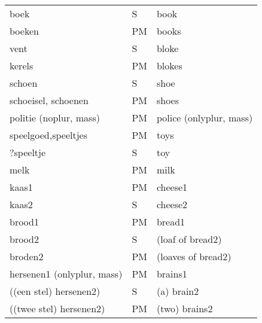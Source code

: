 \begin{tabular}{|l|l|l|} \hline
boek          & S &  book\\        
boeken       & PM &    books\\ \hline

vent               & S &     bloke \\
kerels              & PM &      blokes\\ \hline

schoen              & S&    shoe\\
schoeisel, schoenen              & PM &     shoes\\ \hline
               
politie (noplur, mass) & PM & police (onlyplur, mass)\\ \hline

speelgoed,speeltjes              & PM &    toys\\ 
?speeltje              & S & toy  \\ \hline

melk              &PM &    milk\\ \hline

kaas1              & PM &     cheese1\\
kaas2              & S &     cheese2\\ \hline

brood1              & PM  &    bread1\\
brood2              &  S &    (loaf of bread2)\\
broden2             & PM &    (loaves of bread2)\\ \hline

hersenen1 (onlyplur, mass)               & PM &   brains1  \\
((een stel) hersenen2)                   & S &   (a) brain2 \\
((twee stel) hersenen2)              & PM &    (two) brains2\\ \hline
\end{tabular}




